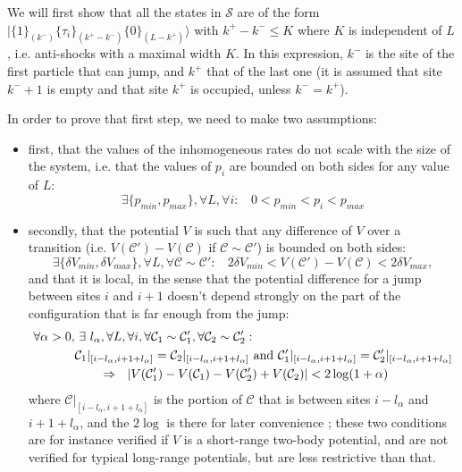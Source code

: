 \documentclass[aps,pre,onecolumn,showpacs,showkeys,a4paper]{revtex4-1}
\begin{document}
We will first show that all the states in $\mathcal{S}$ are of the form $|\{1\}_{(k^-)} \{\tau_i\}_{(k^+-k^-)}\{0\}_{(L-k^+)}\rangle$ with $k^+-k^-\leq K$ where $K$ is independent of $L$, i.e. anti-shocks with a maximal width $K$. In this expression, $k^-$ is the site of the first particle that can jump, and $k^+$ that of the last one (it is assumed that site $k^-+1$ is empty and that site $k^+$ is occupied, unless $k^-=k^+$).

In order to prove that first step, we need to make two assumptions:
\begin{itemize}
\item first, that the values of the inhomogeneous rates do not scale with the size of the system, i.e. that the values of $p_i$ are bounded on both sides for any value of $L$:
\begin{equation}\label{pbound}
\exists \{p_{min},p_{max}\},\forall L,\forall i: ~~~~0< p_{min}<p_i<p_{max}
\end{equation}
\item secondly, that the potential $V$ is such that any difference of $V$ over a transition (i.e. $V(\mathcal{C}')-V(\mathcal{C})$ if $\mathcal{C}\sim \mathcal{C}'$) is bounded on both sides:
\begin{equation}\label{vbound}
\exists \{\delta V_{min},\delta V_{max}\},\forall L,\forall \mathcal{C}\sim \mathcal{C}':~~~~2\delta V_{min}< V(\mathcal{C}')-V(\mathcal{C})< 2\delta V_{max},
\end{equation}
and that it is local, in the sense that the potential difference for a jump between sites $i$ and $i+1$ doesn't depend strongly on the part of the configuration that is far enough from the jump:
\begin{align}\label{vlocal}
\forall \alpha> 0, &~\exists~l_{\alpha}, \forall L, \forall i,\forall \mathcal{C}_1\sim \mathcal{C}_1',\forall \mathcal{C}_2\sim \mathcal{C}_2':\\
&\mathcal{C}_1|_{[i-l_\alpha,i+1+l_\alpha]}=\mathcal{C}_2|_{[i-l_\alpha,i+1+l_\alpha]}~{\rm and}~\mathcal{C}'_1|_{[i-l_\alpha,i+1+l_\alpha]}=\mathcal{C}'_2|_{[i-l_\alpha,i+1+l_\alpha]}\nonumber\\
&~~~~~~\Rightarrow~~|V(\mathcal{C}_1')-V(\mathcal{C}_1)-V(\mathcal{C}_2')+V(\mathcal{C}_2)|<2\log(1+\alpha)\nonumber
\end{align}
where $\mathcal{C}|_{[i-l_\alpha,i+1+l_\alpha]}$ is the portion of $\mathcal{C}$ that is between sites $i-l_\alpha$ and $i+1+l_\alpha$, and the $2\log$ is there for later convenience ; these two conditions are for instance verified if $V$ is a short-range two-body potential, and are not verified for typical long-range potentials, but are less restrictive than that.
\end{itemize}
\end{document}
